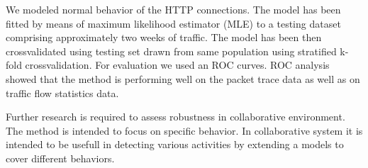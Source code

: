 We modeled normal behavior of the HTTP connections. The model has been fitted
by means of maximum likelihood estimator (MLE) to a testing dataset
comprising approximately two weeks of traffic. The model has been then crossvalidated using testing set 
drawn from same population using stratified k-fold crossvalidation.
For evaluation we used an ROC curves. ROC analysis showed that the method is performing well on 
the packet trace data as well as on traffic flow statistics data.

Further research is required to assess robustness in collaborative environment.
The method is intended to focus on specific behavior. In collaborative system it is intended
to be usefull in detecting  various activities by extending a models to cover different behaviors.

